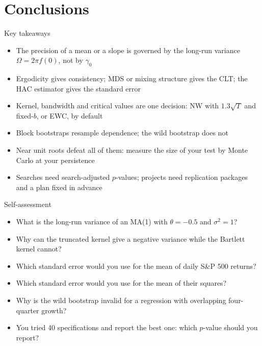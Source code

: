 \section{Conclusions}

\begin{frame}{Key takeaways}
\itemsize{\small}
\begin{itemize}
    \item The precision of a mean or a slope is governed by the long-run variance $\Omega = 2\pi f(0)$, not by $\gamma_0$
    \item Ergodicity gives consistency; MDS or mixing structure gives the CLT; the HAC estimator gives the standard error
    \item Kernel, bandwidth and critical values are one decision: NW with $1.3\sqrt{T}$ and fixed-$b$, or EWC, by default
    \item Block bootstraps resample dependence; the wild bootstrap does not
    \item Near unit roots defeat all of them: measure the size of your test by Monte Carlo at your persistence
    \item Searches need search-adjusted $p$-values; projects need replication packages and a plan fixed in advance
\end{itemize}
\end{frame}

\begin{frame}{Self-assessment}
\itemsize{\small}
\begin{itemize}
    \item What is the long-run variance of an MA(1) with $\theta = -0.5$ and $\sigma^2 = 1$?
    \item Why can the truncated kernel give a negative variance while the Bartlett kernel cannot?
    \item Which standard error would you use for the mean of daily S\&P 500 returns?
    \item Which standard error would you use for the mean of their squares?
    \item Why is the wild bootstrap invalid for a regression with overlapping four-quarter growth?
    \item You tried 40 specifications and report the best one: which $p$-value should you report?
\end{itemize}
\end{frame}

